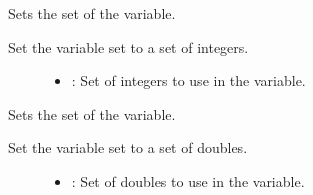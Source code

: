 \documentclass[letterpaper,10pt,english]{sphinxmanual}
\begin{document}
\begin{fulllineitems}
\begin{fulllineitems}
\begin{description}
\begin{itemize}
\end{itemize}

\end{description}


\end{fulllineitems}


\begin{fulllineitems}
\label{\detokenize{index:_CPPv2N7ostendo3Var6SetSetENSt6vectorIiEE}}%
\pysigstartmultiline
{}\label{\detokenize{index:Pessumstructostendo_1_1Var_1a16f5d751d92892e903d3631707fd5ea0}}%
\pysigstopmultiline
Sets the set of the variable. 

Set the variable set to a set of integers. \begin{description}
\item[{}] \leavevmode\begin{itemize}
\item {} 
: Set of integers to use in the variable. 

\end{itemize}

\end{description}


\end{fulllineitems}


\begin{fulllineitems}
\label{\detokenize{index:_CPPv2N7ostendo3Var6SetSetENSt6vectorIdEE}}%
\pysigstartmultiline
{}\label{\detokenize{index:Pessumstructostendo_1_1Var_1a796286e938479ad4d3194915a702defa}}%
\pysigstopmultiline
Sets the set of the variable. 

Set the variable set to a set of doubles. \begin{description}
\item[{}] \leavevmode\begin{itemize}
\item {} 
: Set of doubles to use in the variable. 

\end{itemize}


\end{description}
\end{fulllineitems}
\end{fulllineitems}
\end{document}
